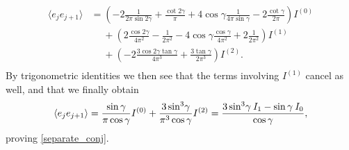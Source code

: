 \documentclass[a4paper,10pt]{article}
\begin{document}
\begin{equation}
\begin{split}
\langle e_j e_{j+1} \rangle  &= 
\left( - 2\frac{1}{2\pi \sin 2\gamma}   
+ \frac{\cot 2\gamma}{\pi}
+4\cos\gamma \frac{1}{4\pi\sin\gamma}
-2 \frac{\cot \gamma}{2\pi}
 \right) I^{(0)}   \\
&\quad\;+ \left( 
%
2 \frac{\cos 2\gamma}{4\pi^2}
-\frac{1}{2\pi^2} - 4\cos \gamma \frac{\cos\gamma}{4\pi^2} +2 \frac{1}{2\pi^2}
%
  \right) I^{(1)} \\
%
%
&\quad\;+ \left( 
-2\frac{3\cos 2\gamma \tan \gamma}{4\pi^3}
+ \frac{3 \tan \gamma}{2 \pi^3}
  \right) I^{(2)}.
 \\
\end{split}
\end{equation}
%
By trigonometric identities we then see that the terms involving $I^{(1)}$ cancel as well, and that we finally obtain 
\begin{equation}
\langle e_j e_{j+1} \rangle  = \frac{\sin\gamma}{\pi\cos\gamma}I^{(0)}  + \frac{3 \sin^3\!\gamma}{\pi^3 \cos\gamma} I^{(2)} 
=
 {3\sin^3 \! \gamma \: I_1-\sin\gamma \: I_0\over \cos\gamma},
\end{equation}
proving \eqref{separate_conj}.
\end{document}
